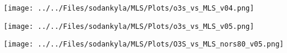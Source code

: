 \begin{frame}
\texttt{[image: ../../Files/sodankyla/MLS/Plots/o3s\_vs\_MLS\_v04.png]}\\
\end{frame}

\begin{frame}
\texttt{[image: ../../Files/sodankyla/MLS/Plots/o3s\_vs\_MLS\_v05.png]}\\
\end{frame}

\begin{frame}
\texttt{[image: ../../Files/sodankyla/MLS/Plots/O3S\_vs\_MLS\_nors80\_v05.png]}\\
\end{frame}




%
%

